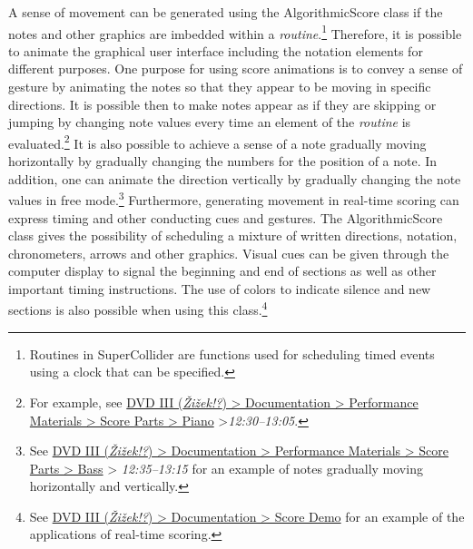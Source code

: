\hypertarget{algoanimation}{}
A sense of movement can be generated using the AlgorithmicScore class if the notes and other graphics are imbedded within a \emph{routine}.\footnote{Routines in SuperCollider are functions used for scheduling timed events using a clock that can be specified.} Therefore, it is possible to animate the graphical user interface including the notation elements for different purposes. One purpose for using score animations is to convey a sense of gesture by animating the notes so that they appear to be moving in specific directions. It is possible then to make notes appear as if they are skipping or jumping by changing note values every time an element of the \emph{routine} is evaluated.\footnote{For example, see \href{http://phd.federicoreuben.com/zizek/documentation/zizek-materials/zizek-parts/zizek-piano/}{DVD III (\emph{\v{Z}i\v{z}ek!?}) \tiny \textgreater \footnotesize \hspace{0pt} Documentation \tiny \textgreater \footnotesize \hspace{0pt} Performance Materials \tiny \textgreater \footnotesize \hspace{0pt} Score Parts \tiny \textgreater \footnotesize \hspace{0pt} Piano} \tiny \textgreater \footnotesize \hspace{0pt}\mbox{\emph{12:30--13:05}}.} It is also possible to achieve a sense of a note gradually moving horizontally by gradually changing the numbers for the position of a note. In addition, one can animate the direction vertically by gradually changing the note values in free mode.\footnote{See \href{http://phd.federicoreuben.com/zizek/documentation/zizek-materials/zizek-parts/zizek-bass/}{DVD III (\emph{\v{Z}i\v{z}ek!?}) \tiny \textgreater \footnotesize \hspace{0pt} Documentation \tiny \textgreater \footnotesize \hspace{0pt} Performance Materials \tiny \textgreater \footnotesize \hspace{0pt} Score Parts \tiny \textgreater \footnotesize \hspace{0pt} Bass} \tiny \textgreater \footnotesize \hspace{0pt} \mbox{\emph{12:35--13:15}} for an example of notes gradually moving horizontally and vertically.} Furthermore, generating movement in real-time scoring can express timing and other conducting cues and gestures. The AlgorithmicScore class gives the possibility of scheduling a mixture of written directions, notation, chronometers, arrows and other graphics.  Visual cues can be given through the computer display to signal the beginning and end of sections as well as other important timing instructions. The use of colors to indicate silence and new sections is also possible when using this class.\footnote{See \href{http://phd.federicoreuben.com/zizek/documentation/score-demo/}{DVD III (\emph{\v{Z}i\v{z}ek!?}) \tiny \textgreater \footnotesize \hspace{0pt} Documentation \tiny \textgreater \footnotesize \hspace{0pt} Score Demo} for an example of the applications of real-time scoring.} 

